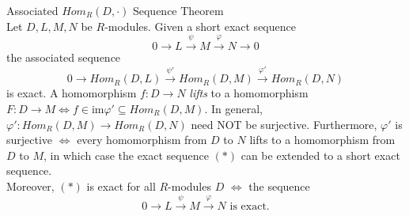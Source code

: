 \begin{theorem}{Associated $Hom_R (D, \cdot)$ Sequence Theorem}\\
Let $D,L,M,N$ be $R$-modules. Given a short exact sequence
$$0 \to L \overset{\psi}{\to} M \overset{\varphi}{\to} N \to 0$$
the associated sequence
\begin{equation*}
    0 \to Hom_R (D,L) \overset{\psi'}{\to} Hom_R(D,M) \overset{\varphi'}{\to} Hom_R(D,N)  \tag{*}
\end{equation*}
is exact. A homomorphism $f:D \to N$ \textit{lifts} to a homomorphism $F: D\to M \Leftrightarrow f\in \text{im} \varphi' \subseteq Hom_R(D,M)$. In general, $\varphi': Hom_R(D,M) \to Hom_R(D,N)$ need NOT be surjective. Furthermore, $\varphi'$ is surjective $\Leftrightarrow$ every homomorphism from $D$ to $N$ lifts to a homomorphism from $D$ to $M$, in which case the exact sequence $(*)$ can be extended to a short exact sequence.\\
Moreover, $(*)$ is exact for all $R$-modules $D$ $\Leftrightarrow$ the sequence
\[ 0\to L \overset{\psi}{\to} M \overset{\varphi}{\to} N \text{ is exact.}\]
\end{theorem}

